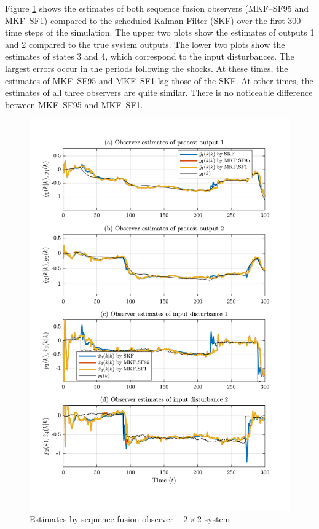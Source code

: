 Figure \ref{fig:rod-obs-sim2-yest-1-SF} shows the estimates of both sequence fusion observers (MKF--SF95 and MKF--SF1) compared to the scheduled Kalman Filter (SKF) over the first 300 time steps of the simulation. The upper two plots show the estimates of outputs 1 and 2 compared to the true system outputs. The lower two plots show the estimates of states 3 and 4, which correspond to the input disturbances. The largest errors occur in the periods following the shocks. At these times, the estimates of MKF--SF95 and MKF--SF1 lag those of the SKF. At other times, the estimates of all three observers are quite similar. There is no noticeable difference between MKF--SF95 and MKF--SF1.
\begin{figure}[htp]
	\centering
	\includegraphics[width=13cm]{images/rod_obs_sim3_all_seed_y_est1_SF95_SF1.pdf}
	\caption{Estimates by sequence fusion observer –  $2\times2$ system}
	\label{fig:rod-obs-sim2-yest-1-SF}
\end{figure}

